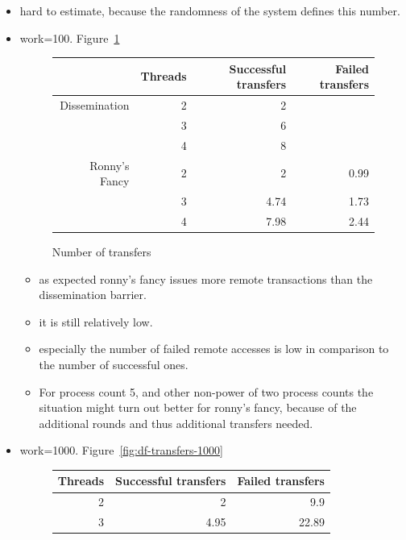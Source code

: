 \documentclass[a4paper, 10pt]{article}
\begin{document}
\begin{itemize}
\begin{itemize}
			\item hard to estimate, because the randomness of the system defines this number.
			\item work=100. Figure~\ref{fig:df-transfers-100}
				\begin{figure}[htbp]
					\centering
					\begin{tabular}{r | r | r r}
						              & Threads & Successful transfers & Failed transfers \\
						\hline
						Dissemination & 2       & 2                     &                 \\
						              & 3       & 6                     &                 \\
						              & 4       & 8                     &                 \\
						\hline
						Ronny's Fancy & 2       & 2                     & 0.99            \\
						              & 3       & 4.74                  & 1.73            \\
						              & 4       & 7.98                  & 2.44            \\
					\end{tabular}
					\caption{Number of transfers}
					\label{fig:df-transfers-100}
				\end{figure}
				\begin{itemize}
					\item as expected ronny's fancy issues more remote transactions than the dissemination barrier.
					\item it is still relatively low.
					\item especially the number of failed remote accesses is low in comparison to the number of successful ones.
					\item For process count 5, and other non-power of two process counts the situation might turn out better for ronny's fancy, because of the additional rounds and thus additional transfers needed.
				\end{itemize}
			\item work=1000. Figure~\ref{fig:df-transfers-1000}
				\begin{figure}[htbp]
					\centering
					\begin{tabular}{r | r r}
						Threads & Successful transfers & Failed transfers \\
						\hline
						2       & 2                     & 9.9             \\
						3       & 4.95                  & 22.89           \\

\end{tabular}
\end{figure}
\end{itemize}
\end{itemize}
\end{document}
